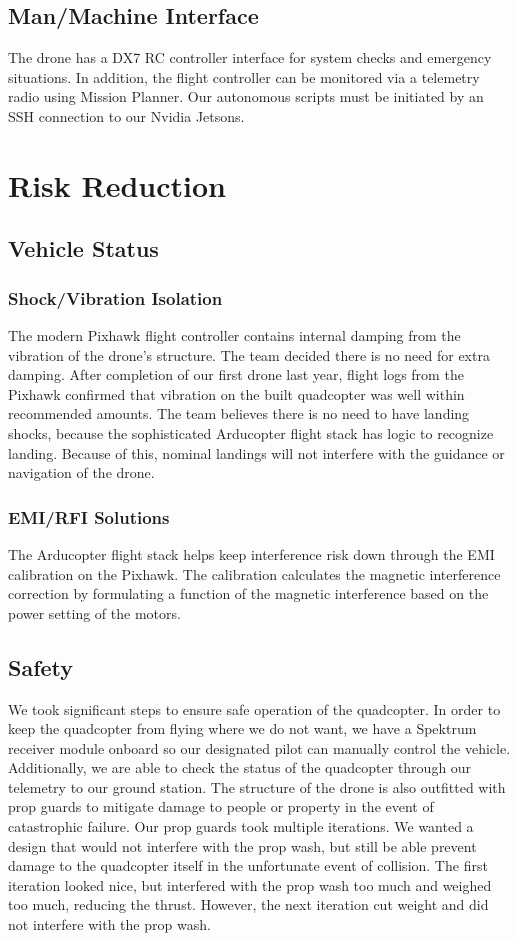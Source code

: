 \documentclass[12pt,letterpaper]{article}
\begin{document}
	\subsection*{Man/Machine Interface}
		The drone has a DX7 RC controller interface for system checks and emergency situations. In addition, the flight controller can be monitored via a telemetry radio using Mission Planner. Our autonomous scripts must be initiated by an SSH connection to our Nvidia Jetsons.

\section*{Risk Reduction}
	\subsection*{Vehicle Status}
		\subsubsection*{Shock/Vibration Isolation}
		The modern Pixhawk flight controller contains internal damping from the vibration of the drone's structure. The team decided there is no need for extra damping. After completion of our first drone last year, flight logs from the Pixhawk confirmed that vibration on the built quadcopter was well within recommended amounts. The team believes there is no need to have landing shocks, because the sophisticated Arducopter flight stack has logic to recognize landing. Because of this, nominal landings will not interfere with the guidance or navigation of the drone.

		\subsubsection*{EMI/RFI Solutions}
		The Arducopter flight stack helps keep interference risk down through the EMI calibration on the Pixhawk. The calibration calculates the magnetic interference correction by formulating a function of the magnetic interference based on the power setting of the motors.


	\subsection*{Safety}
		We took significant steps to ensure safe operation of the quadcopter. In order to keep the quadcopter from flying where we do not want, we have a Spektrum receiver module onboard so our designated pilot can manually control the vehicle. Additionally, we are able to check the status of the quadcopter through our telemetry to our ground station. The structure of the drone is also outfitted with prop guards to mitigate damage to people or property in the event of catastrophic failure. Our prop guards took multiple iterations. We wanted a design that would not interfere with the prop wash, but still be able prevent damage to the quadcopter itself in the unfortunate event of collision. The first iteration looked nice, but interfered with the prop wash too much and weighed too much, reducing the thrust. However, the next iteration cut weight and did not interfere with the prop wash.
\end{document}
